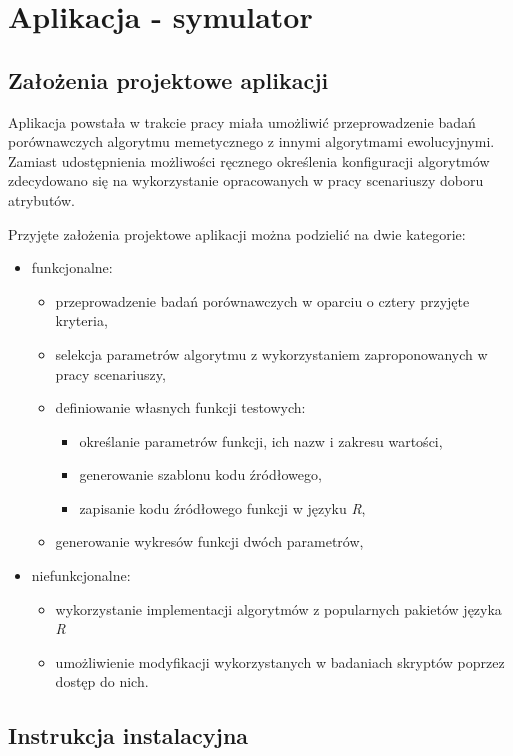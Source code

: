 \chapter{Aplikacja - symulator}
\label{ch:dodatekA-aplikacja}
\section{Założenia projektowe aplikacji}

\par
Aplikacja powstała w trakcie pracy miała umożliwić przeprowadzenie badań porównawczych algorytmu memetycznego z innymi algorytmami ewolucyjnymi. Zamiast udostępnienia możliwości ręcznego określenia konfiguracji algorytmów zdecydowano się na wykorzystanie opracowanych w pracy scenariuszy doboru atrybutów. 

\par
Przyjęte założenia projektowe aplikacji można podzielić na dwie kategorie:
\begin{itemize}
\item funkcjonalne:
\begin{itemize}
\item przeprowadzenie badań porównawczych w oparciu o cztery przyjęte kryteria,
\item selekcja parametrów algorytmu z wykorzystaniem zaproponowanych w pracy scenariuszy,
\item definiowanie własnych funkcji testowych:
\begin{itemize}
\item określanie parametrów funkcji, ich nazw i zakresu wartości,
\item generowanie szablonu kodu źródłowego,
\item zapisanie kodu źródłowego funkcji w języku \emph{R},
\end{itemize}
\item generowanie wykresów funkcji dwóch parametrów,
\end{itemize}
\item niefunkcjonalne:
\begin{itemize}
\item wykorzystanie implementacji algorytmów z popularnych pakietów języka \emph{R}
\item umożliwienie modyfikacji wykorzystanych w badaniach skryptów poprzez dostęp do nich.
\end{itemize}
\end{itemize}

\section{Instrukcja instalacyjna}

